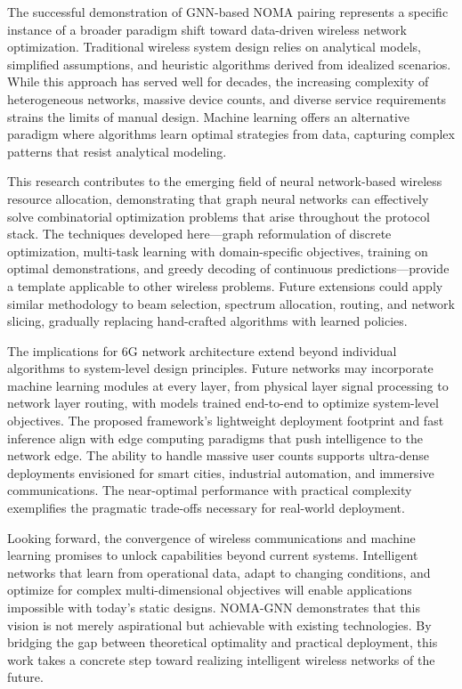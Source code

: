The successful demonstration of GNN-based NOMA pairing represents a specific instance of a broader paradigm shift toward data-driven wireless network optimization. Traditional wireless system design relies on analytical models, simplified assumptions, and heuristic algorithms derived from idealized scenarios. While this approach has served well for decades, the increasing complexity of heterogeneous networks, massive device counts, and diverse service requirements strains the limits of manual design. Machine learning offers an alternative paradigm where algorithms learn optimal strategies from data, capturing complex patterns that resist analytical modeling.

This research contributes to the emerging field of neural network-based wireless resource allocation, demonstrating that graph neural networks can effectively solve combinatorial optimization problems that arise throughout the protocol stack. The techniques developed here—graph reformulation of discrete optimization, multi-task learning with domain-specific objectives, training on optimal demonstrations, and greedy decoding of continuous predictions—provide a template applicable to other wireless problems. Future extensions could apply similar methodology to beam selection, spectrum allocation, routing, and network slicing, gradually replacing hand-crafted algorithms with learned policies.

The implications for 6G network architecture extend beyond individual algorithms to system-level design principles. Future networks may incorporate machine learning modules at every layer, from physical layer signal processing to network layer routing, with models trained end-to-end to optimize system-level objectives. The proposed framework's lightweight deployment footprint and fast inference align with edge computing paradigms that push intelligence to the network edge. The ability to handle massive user counts supports ultra-dense deployments envisioned for smart cities, industrial automation, and immersive communications. The near-optimal performance with practical complexity exemplifies the pragmatic trade-offs necessary for real-world deployment.

Looking forward, the convergence of wireless communications and machine learning promises to unlock capabilities beyond current systems. Intelligent networks that learn from operational data, adapt to changing conditions, and optimize for complex multi-dimensional objectives will enable applications impossible with today's static designs. NOMA-GNN demonstrates that this vision is not merely aspirational but achievable with existing technologies. By bridging the gap between theoretical optimality and practical deployment, this work takes a concrete step toward realizing intelligent wireless networks of the future.


